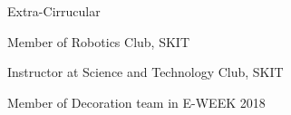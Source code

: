 \documentclass{resume} %
\begin{document}
\begin{rSection}{Extra-Cirrucular} \itemsep -3pt
\item Member of Robotics Club, SKIT
\item Instructor at Science and Technology Club, SKIT
\item Member of Decoration team in E-WEEK 2018

\end{rSection}
%
\end{document}
